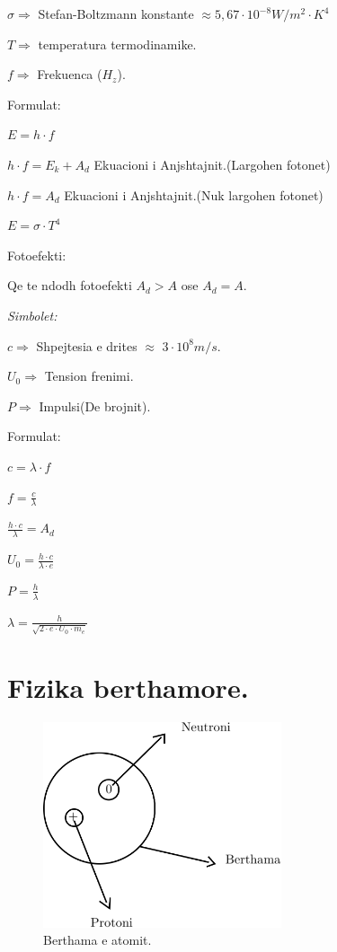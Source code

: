 \documentclass[twocolumn]{article}
\begin{document}
$\sigma \Rightarrow$ Stefan-Boltzmann konstante $\approx$$5,67 \cdot 10^{-8} W/m^2 \cdot K^4$

$T \Rightarrow$ temperatura termodinamike.

$f \Rightarrow$ Frekuenca ($H_z$).

\begin{center}
	Formulat:
\end{center}

$E=h \cdot f$

$h \cdot f= E_k +A_d $ Ekuacioni i Anjshtajnit.(Largohen fotonet)

$h \cdot f=A_d $ Ekuacioni i Anjshtajnit.(Nuk largohen fotonet)

$E= \sigma \cdot T^4$

\begin{center}
	Fotoefekti:
\end{center}

Qe te ndodh fotoefekti $A_d>A$ ose $A_d=A$.

\begin{center}
	\textit{Simbolet:}
\end{center}

$c \Rightarrow$ Shpejtesia e drites $\approx$ $3 \cdot 10^8 m/s$.

$U_0 \Rightarrow$ Tension frenimi.

$P \Rightarrow$ Impulsi(De brojnit).

\begin{center}
	Formulat:
\end{center}

$c= \lambda \cdot f$

$f= \frac{c}{\lambda}$

$\frac{h \cdot c }{\lambda}=A_d$

$U_0 = \frac{h \cdot c}{\lambda \cdot e}$

$P=\frac{h}{\lambda}$

$\lambda = \frac{h}{\sqrt{2 \cdot e \cdot U_0 \cdot m_e}}$

\section{Fizika berthamore.}

\begin{figure}[h]
	\includegraphics[width=70mm]{Imazhet/berthama.png}
	\caption{Berthama e atomit.}
	\label{fig:boat1}
\end{figure}
\end{document}
